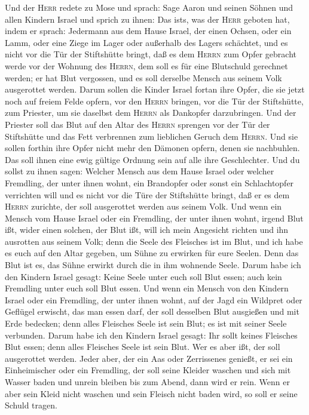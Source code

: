  Und der \textsc{Herr} redete zu Mose und sprach:
 Sage Aaron und seinen Söhnen und allen Kindern Israel und
sprich zu ihnen: Das ist\textquotesingle s, was der \textsc{Herr}
geboten hat, indem er sprach:  Jedermann aus dem Hause
Israel, der einen Ochsen, oder ein Lamm, oder eine Ziege im Lager oder
außerhalb des Lagers schächtet,  und es nicht vor die Tür
der Stiftshütte bringt, daß es dem \textsc{Herrn} zum Opfer gebracht
werde vor der Wohnung des \textsc{Herrn}, dem soll es für eine
Blutschuld gerechnet werden; er hat Blut vergossen, und es soll derselbe
Mensch aus seinem Volk ausgerottet werden.  Darum sollen
die Kinder Israel fortan ihre Opfer, die sie jetzt noch auf freiem Felde
opfern, vor den \textsc{Herrn} bringen, vor die Tür der Stiftshütte, zum
Priester, um sie daselbst dem \textsc{Herrn} als Dankopfer darzubringen.
 Und der Priester soll das Blut auf den Altar des
\textsc{Herrn} sprengen vor der Tür der Stiftshütte und das Fett
verbrennen zum lieblichen Geruch dem \textsc{Herrn}.  Und
sie sollen forthin ihre Opfer nicht mehr den Dämonen opfern, denen sie
nachbuhlen. Das soll ihnen eine ewig gültige Ordnung sein auf alle ihre
Geschlechter.  Und du sollst zu ihnen sagen: Welcher
Mensch aus dem Hause Israel oder welcher Fremdling, der unter ihnen
wohnt, ein Brandopfer oder sonst ein Schlachtopfer verrichten will
 und es nicht vor die Türe der Stiftshütte bringt, daß er
es dem \textsc{Herrn} zurichte, der soll ausgerottet werden aus seinem
Volk.  Und wenn ein Mensch vom Hause Israel oder ein
Fremdling, der unter ihnen wohnt, irgend Blut ißt, wider einen solchen,
der Blut ißt, will ich mein Angesicht richten und ihn ausrotten aus
seinem Volk;  denn die Seele des Fleisches ist im Blut,
und ich habe es euch auf den Altar gegeben, um Sühne zu erwirken für
eure Seelen. Denn das Blut ist es, das Sühne erwirkt durch die in ihm
wohnende Seele.  Darum habe ich den Kindern Israel
gesagt: Keine Seele unter euch soll Blut essen; auch kein Fremdling
unter euch soll Blut essen.  Und wenn ein Mensch von den
Kindern Israel oder ein Fremdling, der unter ihnen wohnt, auf der Jagd
ein Wildpret oder Geflügel erwischt, das man essen darf, der soll
desselben Blut ausgießen und mit Erde bedecken;  denn
alles Fleisches Seele ist sein Blut; es ist mit seiner Seele verbunden.
Darum habe ich den Kindern Israel gesagt: Ihr sollt keines Fleisches
Blut essen; denn alles Fleisches Seele ist sein Blut. Wer es aber ißt,
der soll ausgerottet werden.  Jeder aber, der ein Aas
oder Zerrissenes genießt, er sei ein Einheimischer oder ein Fremdling,
der soll seine Kleider waschen und sich mit Wasser baden und unrein
bleiben bis zum Abend, dann wird er rein.  Wenn er aber
sein Kleid nicht waschen und sein Fleisch nicht baden wird, so soll er
seine Schuld tragen.

